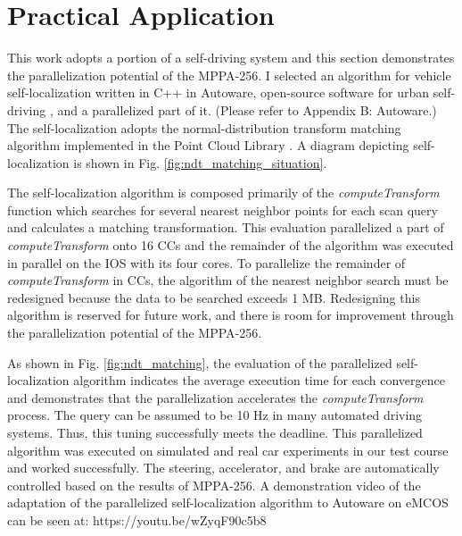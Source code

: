 \section{Practical Application}
\label{sec:practical_application}
This work adopts a portion of a self-driving system and this section demonstrates the parallelization potential of the MPPA-256.
I selected an algorithm for vehicle self-localization written in C++ in Autoware, open-source software for urban self-driving \cite{autoware}, and a parallelized part of it.
(Please refer to Appendix B: Autoware.)
The self-localization adopts the normal-distribution transform matching algorithm \cite{magnusson2009three} implemented in the Point Cloud Library \cite{pcl}.
A diagram depicting self-localization is shown in Fig. \ref{fig:ndt_matching_situation}.


The self-localization algorithm is composed primarily of the \emph{computeTransform} function which searches for several nearest neighbor points for each scan query and calculates a matching transformation.
This evaluation parallelized a part of \emph{computeTransform} onto 16 CCs and the remainder of the algorithm was executed in parallel on the IOS with its four cores.
To parallelize the remainder of \emph{computeTransform} in CCs, the algorithm of the nearest neighbor search must be redesigned because the data to be searched exceeds 1 MB.
Redesigning this algorithm is reserved for future work, and there is room for improvement through the parallelization potential of the MPPA-256.

As shown in Fig. \ref{fig:ndt_matching}, the evaluation of the parallelized self-localization algorithm indicates the average execution time for each convergence and demonstrates that the parallelization accelerates the \emph{computeTransform} process.
The query can be assumed to be 10 Hz in many automated driving systems.
Thus, this tuning successfully meets the deadline.
This parallelized algorithm was executed on simulated and real car experiments in our test course and worked successfully.
The steering, accelerator, and brake are automatically controlled based on the results of MPPA-256.
A demonstration video of the adaptation of the parallelized self-localization algorithm to Autoware on eMCOS can be seen at: https://youtu.be/wZyqF90c5b8  

